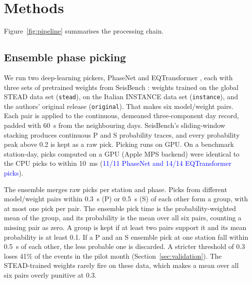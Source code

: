 \documentclass[11pt]{article}
\newcommand{\pilot}[1]{\textcolor{blue}{#1}}
\begin{document}
\section{Methods}
\label{sec:methods}
Figure~\ref{fig:pipeline} summarises the processing chain.

\subsection{Ensemble phase picking}
We run two deep-learning pickers, PhaseNet \citep{zhu2019} and EQTransformer \citep{mousavi2020}, each with three sets of pretrained weights from SeisBench \citep{woollam2022}: weights trained on the global STEAD data set (\texttt{stead}), on the Italian INSTANCE data set (\texttt{instance}), and the authors' original release (\texttt{original}). That makes six model/weight pairs. Each pair is applied to the continuous, demeaned three-component day record, padded with 60~s from the neighbouring days. SeisBench's sliding-window stacking produces continuous P and S probability traces, and every probability peak above 0.2 is kept as a raw pick. Picking runs on GPU. On a benchmark station-day, picks computed on a GPU (Apple MPS backend) were identical to the CPU picks to within 10~ms (\pilot{11/11 PhaseNet and 14/14 EQTransformer picks}).

The ensemble merges raw picks per station and phase. Picks from different model/weight pairs within 0.3~s (P) or 0.5~s (S) of each other form a group, with at most one pick per pair. The ensemble pick time is the probability-weighted mean of the group, and its probability is the mean over all six pairs, counting a missing pair as zero. A group is kept if at least two pairs support it and its mean probability is at least 0.1. If a P and an S ensemble pick at one station fall within 0.5~s of each other, the less probable one is discarded. A stricter threshold of 0.3 loses 41\% of the events in the pilot month (Section~\ref{sec:validation}). The STEAD-trained weights rarely fire on these data, which makes a mean over all six pairs overly punitive at 0.3.
\end{document}
